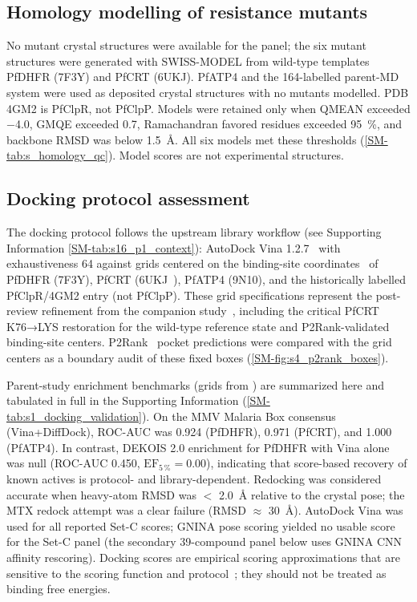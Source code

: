 \documentclass[journal=jcisd8,manuscript=article,layout=traditional]{achemso}
\begin{document}
\subsection{Homology modelling of resistance mutants}

No mutant crystal structures were available for the panel; the six mutant structures were generated with SWISS-MODEL from wild-type templates PfDHFR (7F3Y) and PfCRT (6UKJ). PfATP4 and the 164-labelled parent-MD system were used as deposited crystal structures with no mutants modelled. PDB 4GM2 is PfClpR, not PfClpP. Models were retained only when QMEAN exceeded \num{-4.0}, GMQE exceeded \num{0.7}, Ramachandran favored residues exceeded \qty{95}{\percent}, and backbone RMSD was below \qty{1.5}{\angstrom}. All six models met these thresholds (\cref{SM-tab:s_homology_qc}). Model scores are not experimental structures.

\subsection{Docking protocol assessment}

The docking protocol follows the upstream library workflow (see Supporting Information \cref{SM-tab:s16_p1_context}): AutoDock Vina 1.2.7~\citep{vina_2021} with exhaustiveness \num{64} against grids centered on the binding-site coordinates~\citep{Temgoua2026} of PfDHFR (7F3Y), PfCRT (6UKJ~\citep{Kim2019PfCRT}), PfATP4 (9N10), and the historically labelled PfClpR/4GM2 entry (not PfClpP). These grid specifications represent the post-review refinement from the companion study~\citep{Temgoua2026}, including the critical PfCRT K76→LYS restoration for the wild-type reference state and P2Rank-validated binding-site centers. P2Rank~\citep{Krivak2018P2Rank} pocket predictions were compared with the grid centers as a boundary audit of these fixed boxes (\cref{SM-fig:s4_p2rank_boxes}).

Parent-study enrichment benchmarks (grids from \citealt{Temgoua2026}) are summarized here and tabulated in full in the Supporting Information (\cref{SM-tab:s1_docking_validation}). On the MMV Malaria Box consensus (Vina+DiffDock), ROC-AUC was \num{0.924} (PfDHFR), \num{0.971} (PfCRT), and \num{1.000} (PfATP4). In contrast, DEKOIS 2.0 enrichment for PfDHFR with Vina alone was null (ROC-AUC \num{0.450}, $\mathrm{EF}_{5\,\%} = \num{0.00}$), indicating that score-based recovery of known actives is protocol- and library-dependent. Redocking was considered accurate when heavy-atom RMSD was $<$ \qty{2.0}{\angstrom} relative to the crystal pose; the MTX redock attempt was a clear failure (RMSD $\approx$ \qty{30}{\angstrom}). AutoDock Vina was used for all reported Set-C scores; GNINA pose scoring yielded no usable score for the Set-C panel (the secondary 39-compound panel below uses GNINA CNN affinity rescoring). Docking scores are empirical scoring approximations that are sensitive to the scoring function and protocol~\citep{ferreira2023docking,sadybekov2023computational,kittelson2026docking}; they should not be treated as binding free energies.
\end{document}
